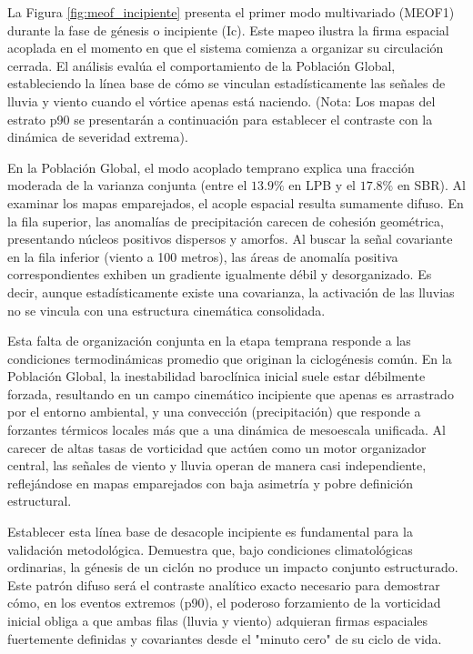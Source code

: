 La Figura \ref{fig:meof_incipiente} presenta el primer modo multivariado (MEOF1) durante la fase de génesis o incipiente (Ic). Este mapeo ilustra la firma espacial acoplada en el momento en que el sistema comienza a organizar su circulación cerrada. El análisis evalúa el comportamiento de la Población Global, estableciendo la línea base de cómo se vinculan estadísticamente las señales de lluvia y viento cuando el vórtice apenas está naciendo. (Nota: Los mapas del estrato p90 se presentarán a continuación para establecer el contraste con la dinámica de severidad extrema).

En la Población Global, el modo acoplado temprano explica una fracción moderada de la varianza conjunta (entre el $13.9\%$ en LPB y el $17.8\%$ en SBR). Al examinar los mapas emparejados, el acople espacial resulta sumamente difuso. En la fila superior, las anomalías de precipitación carecen de cohesión geométrica, presentando núcleos positivos dispersos y amorfos. Al buscar la señal covariante en la fila inferior (viento a 100 metros), las áreas de anomalía positiva correspondientes exhiben un gradiente igualmente débil y desorganizado. Es decir, aunque estadísticamente existe una covarianza, la activación de las lluvias no se vincula con una estructura cinemática consolidada. 

Esta falta de organización conjunta en la etapa temprana responde a las condiciones termodinámicas promedio que originan la ciclogénesis común. En la Población Global, la inestabilidad baroclínica inicial suele estar débilmente forzada, resultando en un campo cinemático incipiente que apenas es arrastrado por el entorno ambiental, y una convección (precipitación) que responde a forzantes térmicos locales más que a una dinámica de mesoescala unificada. Al carecer de altas tasas de vorticidad que actúen como un motor organizador central, las señales de viento y lluvia operan de manera casi independiente, reflejándose en mapas emparejados con baja asimetría y pobre definición estructural.

Establecer esta línea base de desacople incipiente es fundamental para la validación metodológica. Demuestra que, bajo condiciones climatológicas ordinarias, la génesis de un ciclón no produce un impacto conjunto estructurado. Este patrón difuso será el contraste analítico exacto necesario para demostrar cómo, en los eventos extremos (p90), el poderoso forzamiento de la vorticidad inicial obliga a que ambas filas (lluvia y viento) adquieran firmas espaciales fuertemente definidas y covariantes desde el "minuto cero" de su ciclo de vida.

